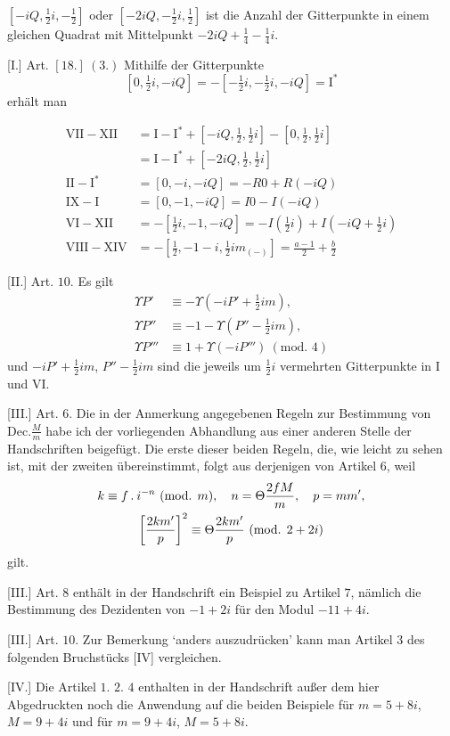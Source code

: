 $[-iQ,\tfrac12i,-\tfrac12]$ oder $[-2iQ,-\tfrac12i,\tfrac12]$ ist die Anzahl der Gitterpunkte in einem gleichen Quadrat mit Mittelpunkt $-2iQ+\tfrac14-\tfrac14i$.

[I.] Art. $[18.]\ (3.)$ Mithilfe der Gitterpunkte
\[
[0,\tfrac12i,-iQ]=-[-\tfrac12i,-\tfrac12i,-iQ]=\mathrm{I}^{*}
\]
erhält man


\[
\begin{aligned}
\mathrm{VII}-\mathrm{XII}&=\mathrm{I}-\mathrm{I}^{*}+[-iQ,\tfrac12,\tfrac12i]-[0,\tfrac12,\tfrac12i]\\
&=\mathrm{I}-\mathrm{I}^{*}+[-2iQ,\tfrac12,\tfrac12i]\\
\mathrm{II}-\mathrm{I}^{*}&=[0,-i,-iQ]=-R0+R(-iQ)\\
\mathrm{IX}-\mathrm{I}&=[0,-1,-iQ]=I0-I(-iQ)\\
\mathrm{VI}-\mathrm{XII}&=-[\tfrac12i,-1,-iQ]=-I(\tfrac12i)+I(-iQ+\tfrac12i)\\
\mathrm{VIII}-\mathrm{XIV}&=-[\tfrac12,-1-i,\tfrac12im_{(-)}]=\frac{a-1}{2}+\frac b2
\end{aligned}
\]

[II.] Art. $10$. Es gilt
\[
\begin{aligned}
\Upsilon P'&\equiv-\Upsilon(-iP'+\tfrac12im),\\
\Upsilon P''&\equiv-1-\Upsilon(P''-\tfrac12im),\\
\Upsilon P'''&\equiv1+\Upsilon(-iP''')\ (\text{mod. }4)
\end{aligned}
\]
und $-iP'+\tfrac12im$, $P''-\tfrac12im$ sind die jeweils um $\tfrac12i$ vermehrten Gitterpunkte in I und VI.

[III.] Art. $6$. Die in der Anmerkung angegebenen Regeln zur Bestimmung von $\mathrm{Dec.}\frac Mm$ habe ich der vorliegenden Abhandlung aus einer anderen Stelle der Handschriften beigefügt. Die erste dieser beiden Regeln, die, wie leicht zu sehen ist, mit der zweiten übereinstimmt, folgt aus derjenigen von Artikel $6$, weil
\[
\begin{gathered}
k\equiv f\mathbin{.} i^{-n}\ (\text{mod. }m),\quad n=\Theta\frac{2fM}{m},\quad p=mm',\\
\left[\frac{2km'}p\right]^2\equiv\Theta\frac{2km'}p\ (\text{mod. }2+2i)
\end{gathered}
\]
gilt.

[III.] Art. $8$ enthält in der Handschrift ein Beispiel zu Artikel $7$, nämlich die Bestimmung des Dezidenten von $-1+2i$ für den Modul $-11+4i$.

[III.] Art. $10$. Zur Bemerkung ‘anders auszudrücken’ kann man Artikel $3$ des folgenden Bruchstücks [IV] vergleichen.

[IV.] Die Artikel $1$. $2$. $4$ enthalten in der Handschrift außer dem hier Abgedruckten noch die Anwendung auf die beiden Beispiele für $m=5+8i$, $M=9+4i$ und für $m=9+4i$, $M=5+8i$.
